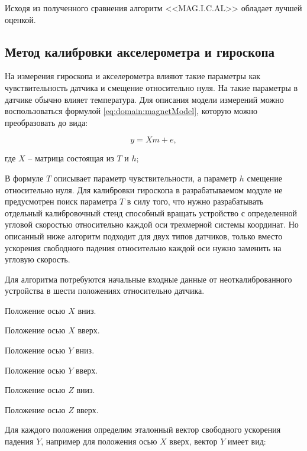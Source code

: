 Исходя из полученного сравнения алгоритм <<MAG.I.C.AL>> обладает лучшей оценкой.

\subsection{Метод калибровки акселерометра и гироскопа}

На измерения гироскопа и акселерометра влияют такие параметры как чувствительность датчика и смещение относительно нуля.
На такие параметры в датчике обычно влияет температура.
Для описания модели измерений можно воспользоваться формулой \ref{eq:domain:magnetModel}, которую можно преобразовать до вида:

\begin{equation}
    \label{eq:domain:accModel}
    y = Xm+e,
  \end{equation}
  \begin{explanationx}
    \item[где] $X$ -- матрица состоящая из $T$ и $h$;
  \end{explanationx}

В формуле $T$ описывает параметр чувствительности, а параметр $h$ смещение относительно нуля.
Для калибровки гироскопа в разрабатываемом модуле не предусмотрен поиск параметра $T$ в силу того, 
что нужно разрабатывать отдельный калибровочный стенд способный вращать устройство с определенной 
угловой скоростью относительно каждой оси трехмерной системы координат. Но описанный ниже алгоритм подходит для двух типов датчиков, 
только вместо ускорения свободного падения относительно каждой оси нужно заменить на угловую скорость.

Для алгоритма потребуются начальные входные данные от неоткалиброванного устройства в шести положениях относительно датчика.
\begin{enumerate_num}
    \item Положение осью $X$ вниз.
    \item Положение осью $X$ вверх.
    \item Положение осью $Y$ вниз.
    \item Положение осью $Y$ вверх.
    \item Положение осью $Z$ вниз.
    \item Положение осью $Z$ вверх.
\end{enumerate_num}

Для каждого положения определим эталонный вектор свободного ускорения падения $Y$, например для положения осью $X$ вверх, вектор $Y$ имеет вид:


